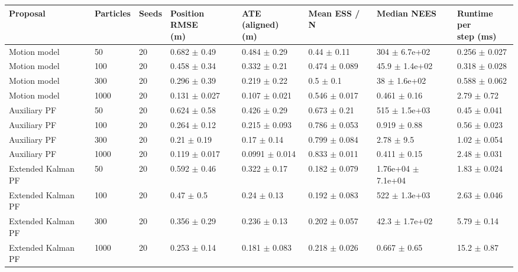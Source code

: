 \begin{tabular}{llllllll}
\toprule
Proposal & Particles & Seeds & \shortstack[l]{Position RMSE\\(m)} & \shortstack[l]{ATE (aligned)\\(m)} & Mean ESS / N & Median NEES & \shortstack[l]{Runtime per\\step (ms)} \\
\midrule
Motion model & 50 & 20 & 0.682 $\pm$ 0.49 & 0.484 $\pm$ 0.29 & 0.44 $\pm$ 0.11 & 304 $\pm$ 6.7e+02 & 0.256 $\pm$ 0.027 \\
Motion model & 100 & 20 & 0.458 $\pm$ 0.34 & 0.332 $\pm$ 0.21 & 0.474 $\pm$ 0.089 & 45.9 $\pm$ 1.4e+02 & 0.318 $\pm$ 0.028 \\
Motion model & 300 & 20 & 0.296 $\pm$ 0.39 & 0.219 $\pm$ 0.22 & 0.5 $\pm$ 0.1 & 38 $\pm$ 1.6e+02 & 0.588 $\pm$ 0.062 \\
Motion model & 1000 & 20 & 0.131 $\pm$ 0.027 & 0.107 $\pm$ 0.021 & 0.546 $\pm$ 0.017 & 0.461 $\pm$ 0.16 & 2.79 $\pm$ 0.72 \\
Auxiliary PF & 50 & 20 & 0.624 $\pm$ 0.58 & 0.426 $\pm$ 0.29 & 0.673 $\pm$ 0.21 & 515 $\pm$ 1.5e+03 & 0.45 $\pm$ 0.041 \\
Auxiliary PF & 100 & 20 & 0.264 $\pm$ 0.12 & 0.215 $\pm$ 0.093 & 0.786 $\pm$ 0.053 & 0.919 $\pm$ 0.88 & 0.56 $\pm$ 0.023 \\
Auxiliary PF & 300 & 20 & 0.21 $\pm$ 0.19 & 0.17 $\pm$ 0.14 & 0.799 $\pm$ 0.084 & 2.78 $\pm$ 9.5 & 1.02 $\pm$ 0.054 \\
Auxiliary PF & 1000 & 20 & 0.119 $\pm$ 0.017 & 0.0991 $\pm$ 0.014 & 0.833 $\pm$ 0.011 & 0.411 $\pm$ 0.15 & 2.48 $\pm$ 0.031 \\
Extended Kalman PF & 50 & 20 & 0.592 $\pm$ 0.46 & 0.322 $\pm$ 0.17 & 0.182 $\pm$ 0.079 & 1.76e+04 $\pm$ 7.1e+04 & 1.83 $\pm$ 0.024 \\
Extended Kalman PF & 100 & 20 & 0.47 $\pm$ 0.5 & 0.24 $\pm$ 0.13 & 0.192 $\pm$ 0.083 & 522 $\pm$ 1.3e+03 & 2.63 $\pm$ 0.046 \\
Extended Kalman PF & 300 & 20 & 0.356 $\pm$ 0.29 & 0.236 $\pm$ 0.13 & 0.202 $\pm$ 0.057 & 42.3 $\pm$ 1.7e+02 & 5.79 $\pm$ 0.14 \\
Extended Kalman PF & 1000 & 20 & 0.253 $\pm$ 0.14 & 0.181 $\pm$ 0.083 & 0.218 $\pm$ 0.026 & 0.667 $\pm$ 0.65 & 15.2 $\pm$ 0.87 \\
\bottomrule
\end{tabular}
